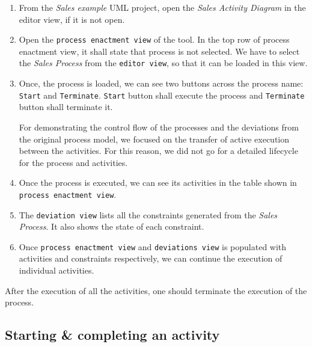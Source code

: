 \documentclass[twoside,a4paper]{refart}
\begin{document}
\begin{enumerate}
\item From the \emph{Sales example} UML project, open the \emph{Sales Activity Diagram} in the editor view, if it is not open.

\item Open the \texttt{process enactment view} of the tool.  In the top row of process enactment view, it shall state that process is not selected.  We have to select the \emph{Sales Process} from the \texttt{editor view}, so that it can be loaded in this view.  

\item Once, the process is loaded, we can see two buttons across the process name: \texttt{Start} and \texttt{Terminate}.  \texttt{Start} button shall execute the process and \texttt{Terminate} button shall terminate it.

\attention
For demonstrating the control flow of the processes and the deviations from the original process model, we focused on the transfer of active execution between the activities.  For this reason, we did not go for a detailed lifecycle for the process and activities.  

\item Once the process is executed, we can see its activities in the table shown in \texttt{process enactment view}.

\item The \texttt{deviation view} lists all the constraints generated from the \emph{Sales Process}.  It also shows the state of each constraint. 

\item Once \texttt{process enactment view} and \texttt{deviations view} is populated with activities and constraints respectively, we can continue the execution of individual activities.
\end{enumerate}

After the execution of all the activities, one should terminate the execution of the process.  

\subsection{Starting \& completing an activity}
\label{executeActivity}
\end{document}
